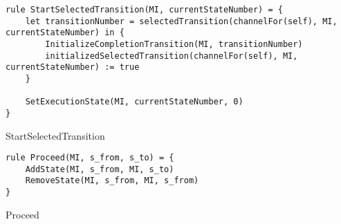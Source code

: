 \begin{listing}[H]
\begin{verbatim}
rule StartSelectedTransition(MI, currentStateNumber) = {
    let transitionNumber = selectedTransition(channelFor(self), MI, currentStateNumber) in {
        InitializeCompletionTransition(MI, transitionNumber)
        initializedSelectedTransition(channelFor(self), MI, currentStateNumber) := true
    }

    SetExecutionState(MI, currentStateNumber, 0)
}
\end{verbatim}
\caption{StartSelectedTransition}
\label{lst:asm:StartSelectedTransition}
\end{listing}






\begin{listing}[H]
\begin{verbatim}
rule Proceed(MI, s_from, s_to) = {
    AddState(MI, s_from, MI, s_to)
    RemoveState(MI, s_from, MI, s_from)
}
\end{verbatim}
\caption{Proceed}
\label{lst:asm:Proceed}
\end{listing}




